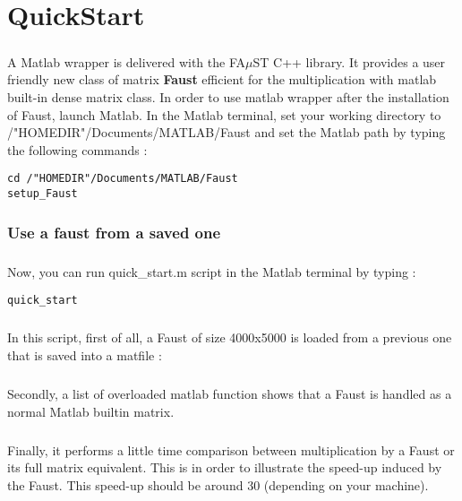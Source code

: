 \chapter{QuickStart}\label{sec:firstUse}


\paragraph{}A Matlab wrapper is delivered with the FA$\mu$ST C++ library.
It provides a user friendly new class of matrix \textbf{Faust} efficient for the multiplication with matlab built-in dense matrix class.\newline
In order to use matlab wrapper after the installation of Faust, launch Matlab.
In the Matlab terminal, set your working directory to /"HOMEDIR"/Documents/MATLAB/Faust and set the Matlab path by typing the following commands :

\begin{lstlisting}
cd /"HOMEDIR"/Documents/MATLAB/Faust
setup_Faust
\end{lstlisting}

\subsection{Use a faust from a saved one}\label{sec:firstUseBuildFromSave}
\paragraph{} Now, you can run quick\_start.m script in the Matlab terminal by typing :
\begin{lstlisting}
quick_start
\end{lstlisting}
\paragraph{}In this script, first of all, a Faust of size 4000x5000 is loaded from a previous one that is saved into a matfile :

\paragraph{}Secondly, a list of overloaded matlab function shows that a Faust is handled as a normal Matlab builtin matrix.
 


\paragraph{}Finally, it performs a little time comparison between multiplication by a Faust or its full matrix equivalent.
This is in order to illustrate the speed-up induced by the Faust. This speed-up should be around 30 (depending on your machine).



